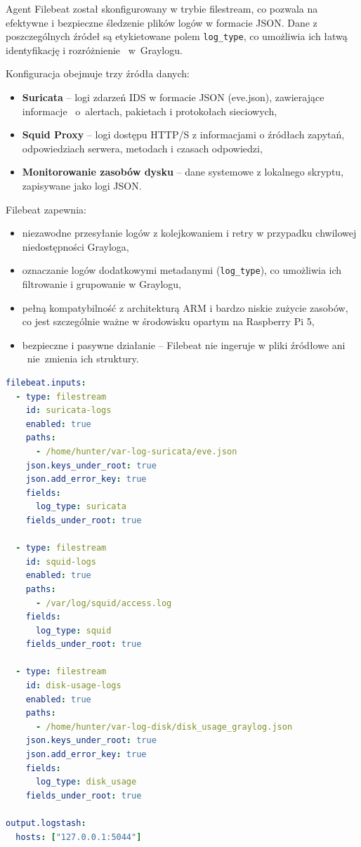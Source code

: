 \documentclass[
    left=2.5cm,         %
    right=2.5cm,        %
    top=2.5cm,          %
    bottom=3cm,         %
    bindingoffset=6mm,  %
    nohyphenation=true %
]{eiti/eiti-thesis} %
\begin{document}
Agent Filebeat został skonfigurowany w trybie filestream, co pozwala na efektywne i bezpieczne śledzenie plików logów w formacie JSON. Dane z poszczególnych źródeł 
są etykietowane polem \texttt{log\_type}, co umożliwia ich łatwą identyfikację i rozróżnienie ~w~Graylogu.

Konfiguracja obejmuje trzy źródła danych:
\begin{itemize}
    \item \textbf{Suricata} – logi zdarzeń IDS w formacie JSON (eve.json), zawierające informacje ~o~alertach, pakietach i protokołach sieciowych,
    \item \textbf{Squid Proxy} – logi dostępu HTTP/S z informacjami o źródłach zapytań, odpowiedziach serwera, metodach i czasach odpowiedzi,
    \item \textbf{Monitorowanie zasobów dysku} – dane systemowe z lokalnego skryptu, zapisywane jako logi JSON.
\end{itemize}

Filebeat zapewnia:
\begin{itemize}
    \item niezawodne przesyłanie logów z kolejkowaniem i retry w przypadku chwilowej niedostępności Grayloga,
    \item oznaczanie logów dodatkowymi metadanymi (\texttt{log\_type}), co umożliwia ich filtrowanie i grupowanie w Graylogu,
    \item pełną kompatybilność z architekturą ARM i bardzo niskie zużycie zasobów, co jest szczególnie ważne w środowisku opartym na Raspberry Pi 5,
    \item bezpieczne i pasywne działanie – Filebeat nie ingeruje w pliki źródłowe ani ~nie~zmienia ich struktury.
\end{itemize}

\newpage
\begin{lstlisting}[language=yaml, caption={Przykładowa konfiguracja Filebeat (filebeat.yml)}, label={lst:filebeat-config}]
filebeat.inputs:
  - type: filestream
    id: suricata-logs
    enabled: true
    paths:
      - /home/hunter/var-log-suricata/eve.json
    json.keys_under_root: true
    json.add_error_key: true
    fields:
      log_type: suricata
    fields_under_root: true

  - type: filestream
    id: squid-logs
    enabled: true
    paths:
      - /var/log/squid/access.log
    fields:
      log_type: squid
    fields_under_root: true

  - type: filestream
    id: disk-usage-logs
    enabled: true
    paths:
      - /home/hunter/var-log-disk/disk_usage_graylog.json
    json.keys_under_root: true
    json.add_error_key: true
    fields:
      log_type: disk_usage
    fields_under_root: true

output.logstash:
  hosts: ["127.0.0.1:5044"]
\end{lstlisting}
\end{document}

